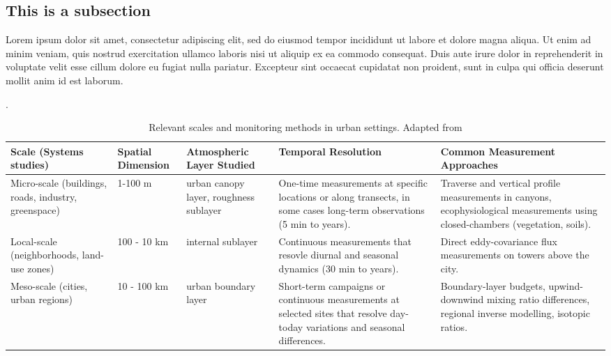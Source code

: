 \subsection{This is a subsection }
\label{sec:subsection1}

Lorem ipsum dolor sit amet, consectetur adipiscing elit, sed do eiusmod tempor incididunt ut labore et dolore magna aliqua. Ut enim ad minim veniam, quis nostrud exercitation ullamco laboris nisi ut aliquip ex ea commodo consequat. Duis aute irure dolor in reprehenderit in voluptate velit esse cillum dolore eu fugiat nulla pariatur. Excepteur sint occaecat cupidatat non proident, sunt in culpa qui officia deserunt mollit anim id est laborum.


\begin{table}[htbp]
\centering
    \caption[Table of measurement methods at various urban scales]{Relevant scales and monitoring methods in urban settings. Adapted from \citep{}}.
    \label{table:scales}
\begin{tabular}{L{2cm}L{1cm}L{2cm}L{3cm}L{3cm}} 
 \toprule 
Scale (Systems studies)  & Spatial Dimension & Atmospheric Layer Studied  & Temporal Resolution & Common Measurement Approaches\\
\midrule 
Micro-scale (buildings, roads, industry, greenspace) & 1-100 m  & urban canopy layer, roughness sublayer & One-time measurements at specific locations or along transects, in some cases long-term observations (5 min to years). & Traverse and vertical profile measurements in canyons, ecophysiological measurements using closed-chambers (vegetation, soils). \\
Local-scale (neighborhoods, land-use zones)          & 100 - 10 km       & internal sublayer                      & Continuous measurements that resovle diurnal and seasonal dynamics (30 min to years).                                         & Direct eddy-covariance flux measurements on towers above the city.                                                              \\
Meso-scale (cities, urban regions)                   & 10 - 100 km       & urban boundary layer                   & Short-term campaigns or continuous measurements at selected sites that resolve day-today variations and seasonal differences. & Boundary-layer budgets, upwind-downwind mixing ratio differences, regional inverse modelling, isotopic ratios.  \\            
\bottomrule 
\end{tabular} 
\end{table}
\FloatBarrier

